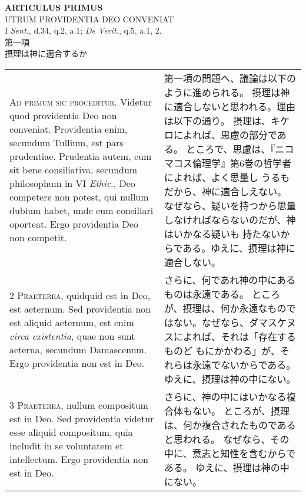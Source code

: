 \documentclass[10pt]{jsarticle} %
\begin{document}
\begin{center}
 {\Large {\bf ARTICULUS PRIMUS}}\\
 {\large UTRUM PROVIDENTIA DEO CONVENIAT}\\
 {\footnotesize I {\itshape Sent.}, d.34, q.2, a.1; {\itshape De
 Verit.}, q.5, a.1, 2.}\\
 {\Large 第一項\\摂理は神に適合するか}
\end{center}

\begin{longtable}{p{21em}p{21em}}




{\Huge A}{\scshape d primum sic proceditur}. Videtur quod
providentia Deo non conveniat. Providentia enim, secundum Tullium, est
pars prudentiae. Prudentia autem, cum sit bene consiliativa, secundum
philosophum in VI {\itshape Ethic}., Deo competere non potest, qui nullum dubium
habet, unde eum consiliari oporteat. Ergo providentia Deo non competit.


&

第一項の問題へ、議論は以下のように進められる。
摂理は神に適合しないと思われる。理由は以下の通り。
摂理は、キケロによれば、思慮の部分である。
ところで、思慮は、『ニコマコス倫理学』第6巻の哲学者によれば、よく思量し
 うるもだから、神に適合しえない。
なぜなら、疑いを持つから思量しなければならないのだが、神はいかなる疑いも
 持たないからである。ゆえに、摂理は神に適合しない。

\\


{\scshape 2 Praeterea}, quidquid est in Deo, est
aeternum. Sed providentia non est aliquid aeternum, est enim {\itshape circa
existentia}, quae non sunt aeterna, secundum Damascenum. Ergo providentia
non est in Deo.


&

さらに、何であれ神の中にあるものは永遠である。
ところが、摂理は、何か永遠なものではない。なぜなら、ダマスケヌスによれば、それは「存在するものど
 もにかかわる」が、それらは永遠でないからである。
ゆえに、摂理は神の中にない。


\\


{\scshape 3 Praeterea}, nullum compositum est in
Deo. Sed providentia videtur esse aliquid compositum, quia includit in
se voluntatem et intellectum. Ergo providentia non est in Deo.


&

さらに、神の中にはいかなる複合体もない。
ところが、摂理は、何か複合されたものであると思われる。
なぜなら、その中に、意志と知性を含むからである。
ゆえに、摂理は神の中にない。



\end{longtable}
\end{document}
